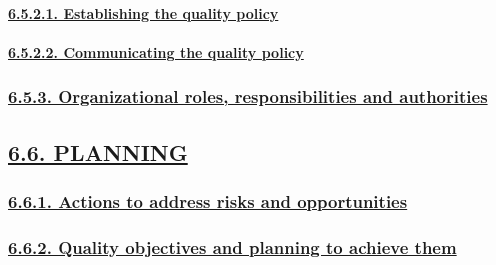 \documentclass[
]{article}
\begin{document}
\hypertarget{establishing-the-quality-policy}{%
\paragraph{\texorpdfstring{\protect\hyperlink{establishing-the-quality-policy-1}{6.5.2.1.
Establishing the quality
policy}}{6.5.2.1. Establishing the quality policy}}\label{establishing-the-quality-policy}}

\hypertarget{communicating-the-quality-policy}{%
\paragraph{\texorpdfstring{\protect\hyperlink{communicating-the-quality-policy-1}{6.5.2.2.
Communicating the quality
policy}}{6.5.2.2. Communicating the quality policy}}\label{communicating-the-quality-policy}}

\hypertarget{organizational-roles-responsibilities-and-authorities}{%
\subsubsection{\texorpdfstring{\protect\hyperlink{organizational-roles-responsibilities-and-authorities-1}{6.5.3.
Organizational roles, responsibilities and
authorities}}{6.5.3. Organizational roles, responsibilities and authorities}}\label{organizational-roles-responsibilities-and-authorities}}

\hypertarget{planning}{%
\subsection{\texorpdfstring{\protect\hyperlink{planning-1}{6.6.
PLANNING}}{6.6. PLANNING}}\label{planning}}

\hypertarget{actions-to-address-risks-and-opportunities}{%
\subsubsection{\texorpdfstring{\protect\hyperlink{actions-to-address-risks-and-opportunities-1}{6.6.1.
Actions to address risks and
opportunities}}{6.6.1. Actions to address risks and opportunities}}\label{actions-to-address-risks-and-opportunities}}

\hypertarget{quality-objectives-and-planning-to-achieve-them}{%
\subsubsection{\texorpdfstring{\protect\hyperlink{quality-objectives-and-planning-to-achieve-them-1}{6.6.2.
Quality objectives and planning to achieve
them}}{6.6.2. Quality objectives and planning to achieve them}}\label{quality-objectives-and-planning-to-achieve-them}}
\end{document}
